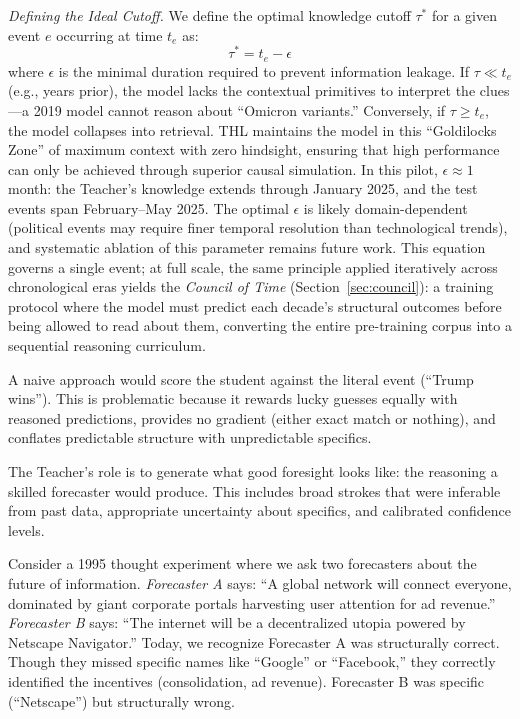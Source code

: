 \documentclass[11pt,a4paper]{article}
\begin{document}
\medskip\noindent\textit{Defining the Ideal Cutoff.}
We define the optimal knowledge cutoff $\tau^*$ for a given event $e$ occurring at time $t_e$ as:
\begin{equation}
    \tau^* = t_e - \epsilon
\end{equation}
where $\epsilon$ is the minimal duration required to prevent information leakage. If $\tau \ll t_e$ (e.g., years prior), the model lacks the contextual primitives to interpret the clues---a 2019 model cannot reason about ``Omicron variants.'' Conversely, if $\tau \ge t_e$, the model collapses into retrieval. THL maintains the model in this ``Goldilocks Zone'' of maximum context with zero hindsight, ensuring that high performance can only be achieved through superior causal simulation. In this pilot, $\epsilon \approx 1$ month: the Teacher's knowledge extends through January 2025, and the test events span February--May 2025. The optimal $\epsilon$ is likely domain-dependent (political events may require finer temporal resolution than technological trends), and systematic ablation of this parameter remains future work. This equation governs a single event; at full scale, the same principle applied iteratively across chronological eras yields the \textit{Council of Time} (Section~\ref{sec:council}): a training protocol where the model must predict each decade's structural outcomes before being allowed to read about them, converting the entire pre-training corpus into a sequential reasoning curriculum.

A naive approach would score the student against the literal event (``Trump wins''). This is problematic because it rewards lucky guesses equally with reasoned predictions, provides no gradient (either exact match or nothing), and conflates predictable structure with unpredictable specifics.

The Teacher's role is to generate what good foresight looks like: the reasoning a skilled forecaster would produce. This includes broad strokes that were inferable from past data, appropriate uncertainty about specifics, and calibrated confidence levels.

Consider a 1995 thought experiment where we ask two forecasters about the future of information. \textit{Forecaster A} says: ``A global network will connect everyone, dominated by giant corporate portals harvesting user attention for ad revenue.'' \textit{Forecaster B} says: ``The internet will be a decentralized utopia powered by Netscape Navigator.'' Today, we recognize Forecaster A was structurally correct. Though they missed specific names like ``Google'' or ``Facebook,'' they correctly identified the incentives (consolidation, ad revenue). Forecaster B was specific (``Netscape'') but structurally wrong.
\end{document}
